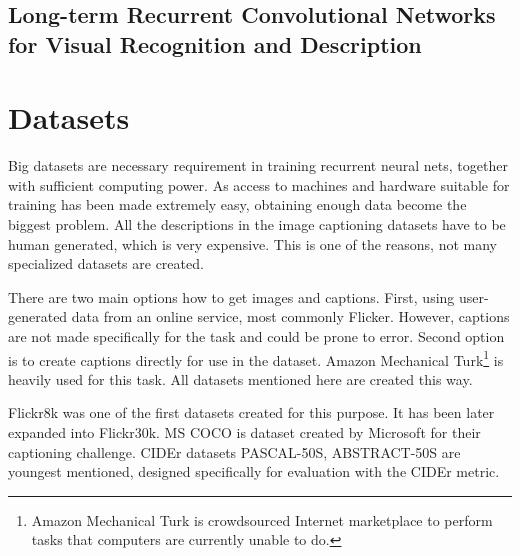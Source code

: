 		\subsection{Long-term Recurrent Convolutional Networks for Visual Recognition and Description}
		\cite{DBLP:journals/corr/DonahueHGRVSD14}


	\section{Datasets}
	\label{sec:datasets}		
Big datasets are necessary requirement in training recurrent neural nets, together with sufficient computing power. As access to machines and hardware suitable for training has been made extremely easy, obtaining enough data become the biggest problem. All the descriptions in the image captioning datasets have to be human generated, which is very expensive. This is one of the reasons, not many specialized datasets are created.

There are two main options how to get images and captions. First, using user-generated data from an online service, most commonly Flicker. However, captions are not made specifically for the task and could be prone to error. Second option is to create captions directly for use in the dataset. Amazon Mechanical Turk\footnote{Amazon Mechanical Turk is crowdsourced Internet marketplace to perform tasks that computers are currently unable to do.} is heavily used for this task. All datasets mentioned here are created this way.

Flickr8k\cite{dataset-flickr8k} was one of the first datasets created for this purpose. It has been later expanded into Flickr30k\cite{dataset-flickr30k}. MS COCO\cite{DBLP:journals/corr/ChenFLVGDZ15} is dataset created by Microsoft for their captioning challenge. CIDEr\cite{Vedantam_2015_CVPR} datasets PASCAL-50S, ABSTRACT-50S are youngest mentioned, designed specifically for evaluation with the CIDEr metric.

\def\arraystretch{1.2}%

